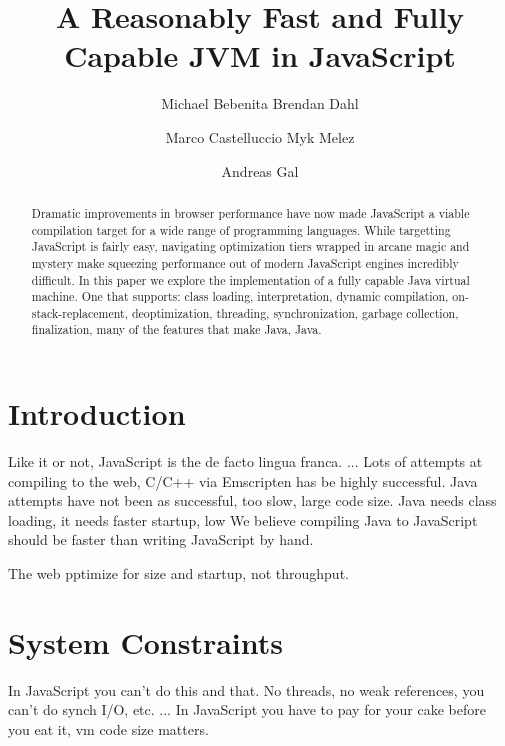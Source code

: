 \documentclass{acm_proc_article-sp}
\begin{document}
\title{A Reasonably Fast and Fully Capable JVM in JavaScript}

\author{
\alignauthor Michael Bebenita
\alignauthor Brendan Dahl
\and
\alignauthor Marco Castelluccio
\alignauthor Myk Melez
\and
\alignauthor Andreas Gal
}

\maketitle
\begin{abstract}
Dramatic improvements in browser performance have now made JavaScript a viable compilation target for a wide range of programming languages.
While targetting JavaScript is fairly easy, navigating optimization tiers wrapped in arcane magic and mystery make squeezing performance out of modern JavaScript engines incredibly difficult.
In this paper we explore the implementation of a fully capable Java virtual machine.
One that supports: class loading, interpretation, dynamic compilation, on-stack-replacement, deoptimization, threading, synchronization, garbage collection, finalization, many of the features that make Java, Java.
\end{abstract}




\section{Introduction}

Like it or not, JavaScript is the de facto lingua franca. ...
Lots of attempts at compiling to the web, C/C++ via Emscripten has be highly successful.
Java attempts have not been as successful, too slow, large code size.
Java needs class loading, it needs faster startup, low 
We believe compiling Java to JavaScript should be faster than writing JavaScript by hand.

The web pptimize for size and startup, not throughput.

\section{System Constraints}

In JavaScript you can't do this and that. No threads, no weak references, you can't do synch I/O, etc. ...
In JavaScript you have to pay for your cake before you eat it, vm code size matters.
\end{document}
